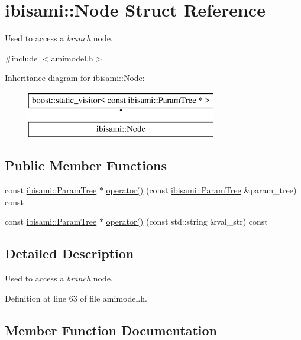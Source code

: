 \hypertarget{structibisami_1_1_node}{}\section{ibisami\+:\+:Node Struct Reference}
\label{structibisami_1_1_node}


Used to access a {\itshape branch} node.  




{\ttfamily \#include $<$amimodel.\+h$>$}

Inheritance diagram for ibisami\+:\+:Node\+:\begin{figure}[H]
\begin{center}
\leavevmode
\includegraphics[height=2.000000cm]{structibisami_1_1_node}
\end{center}
\end{figure}
\subsection*{Public Member Functions}
\begin{DoxyCompactItemize}
\item 
const \hyperlink{structibisami_1_1_param_tree}{ibisami\+::\+Param\+Tree} $\ast$ \hyperlink{structibisami_1_1_node_a138863b6b5304b1daeb7453e6c191900}{operator()} (const \hyperlink{structibisami_1_1_param_tree}{ibisami\+::\+Param\+Tree} \&param\+\_\+tree) const 
\item 
const \hyperlink{structibisami_1_1_param_tree}{ibisami\+::\+Param\+Tree} $\ast$ \hyperlink{structibisami_1_1_node_a0ca5b7bc333470b4772b7bc88434f4c2}{operator()} (const std\+::string \&val\+\_\+str) const 
\end{DoxyCompactItemize}


\subsection{Detailed Description}
Used to access a {\itshape branch} node. 

Definition at line 63 of file amimodel.\+h.



\subsection{Member Function Documentation}
\hypertarget{structibisami_1_1_node_a138863b6b5304b1daeb7453e6c191900}{}
